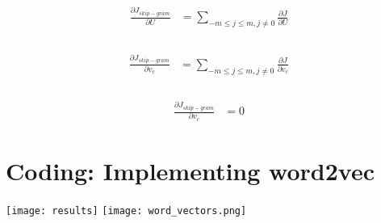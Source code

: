 \documentclass{article}
\begin{document}
\subsection{}
\begin{align*}
\frac{\partial J_{skip-gram}}{\partial U} 
 &= \sum_{-m\leq j \leq m, j \neq 0} {\frac{\partial J}{\partial U}} \\
\end{align*}
\\
\begin{align*}
\frac{\partial J_{skip-gram}}{\partial v_c} 
 &= \sum_{-m\leq j \leq m, j \neq 0} {\frac{\partial J}{\partial v_c}} \\
\end{align*}
\\
\begin{align*}
\frac{\partial J_{skip-gram}}{\partial v_c} 
 &= 0
\end{align*}

\section{Coding: Implementing word2vec}
\texttt{[image: results]}
\texttt{[image: word\_vectors.png]}
\end{document}

